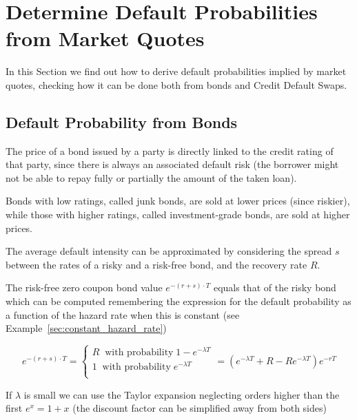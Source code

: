 \section{Determine Default Probabilities from Market Quotes}
In this Section we find out how to derive default probabilities implied by market quotes, checking how it can be done both from bonds and Credit Default Swaps.

\subsection{Default Probability from Bonds}
\label{default-probabilities-and-bond-prices}

The price of a bond issued by a party is directly linked to the credit rating of that party, since there is always an associated default risk (the borrower might not be able to repay fully or partially the amount of the taken loan). 

Bonds with low ratings, called junk bonds, are sold at lower prices (since riskier), while those with higher ratings, called investment-grade bonds, are sold at higher prices.


The average default intensity can be approximated by considering the spread $s$ between the rates of a risky and a risk-free bond, and the recovery rate $R$.

The risk-free zero coupon bond value $e^{-(r+s)\cdot T}$ equals that of the risky bond which can be computed remembering the expression for the default probability as a function of the hazard rate when this is constant (see Example~\ref{sec:constant_hazard_rate})

\begin{equation}
e^{-(r+s)\cdot T} = 
\begin{cases}
R\;\;\textrm{with probability}\;1 - e^{-\lambda T} \\
1\;\;\textrm{with probability}\;e^{-\lambda T} \\
\end{cases} = 
(e^{-\lambda T} + R - R e^{-\lambda T})e^{-rT}
\end{equation}

If $\lambda$ is small we can use the Taylor expansion neglecting orders higher than the first $e^{x} = 1 + x$ (the discount factor can be simplified away from both sides)

